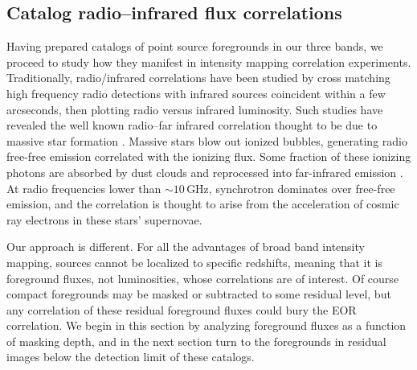 \documentclass[numberedappendix]{emulateapj}
\begin{document}
\subsection{Catalog radio--infrared flux correlations}
\label{sec:catcorrelations}

Having prepared catalogs of point source foregrounds in our three bands, we proceed to study how they manifest in intensity mapping correlation experiments. Traditionally, radio/infrared correlations have been studied by cross matching high frequency radio detections with infrared sources coincident within a few arcseconds, then plotting radio versus infrared luminosity. Such studies have revealed the well known radio--far infrared correlation thought to be due to massive star formation \citep[e.g.][]{helou85,dejong85,yun01,xu94,mauch07,Willott03}. Massive stars blow out ionized bubbles, generating radio free-free emission correlated with the ionizing flux. Some fraction of these ionizing photons are absorbed by dust clouds and reprocessed into far-infrared emission \citep{xu94}. At radio frequencies lower than $\sim10$\,GHz, synchrotron dominates over free-free emission, and the correlation is thought to arise from the acceleration of cosmic ray electrons in these stars' supernovae. 

Our approach is different. For all the advantages of broad band intensity mapping, sources cannot be localized to specific redshifts, meaning that it is foreground fluxes, not luminosities, whose correlations are of interest. Of course compact foregrounds may be masked or subtracted to some residual level, but any correlation of these residual foreground fluxes could bury the EOR correlation. We begin in this section by analyzing foreground fluxes as a function of masking depth, and in the next section turn to the foregrounds in residual images below the detection limit of these catalogs. %
\end{document}
